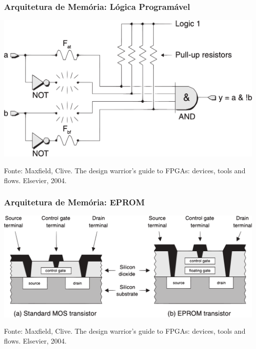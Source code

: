 \documentclass[10pt, compress]{beamer}
\begin{document}
\begin{frame}
    \frametitle{Arquitetura de Memória: Lógica Programável}
    \begin{center}
        \includegraphics[width=.75\textwidth]{fusible-programmed}
    \end{center}

    \vfill

    \begin{center}
        \scriptsize{Fonte: Maxfield, Clive. The design warrior's guide to FPGAs: devices, tools and flows. Elsevier, 2004.}
    \end{center}
\end{frame}

\begin{frame}
    \frametitle{Arquitetura de Memória: EPROM}
    \begin{center}
        \includegraphics[width=.75\textwidth]{eprom-transistor}
    \end{center}

    \vfill

    \begin{center}
        \scriptsize{Fonte: Maxfield, Clive. The design warrior's guide to FPGAs: devices, tools and flows. Elsevier, 2004.}
    \end{center}
\end{frame}
\end{document}
